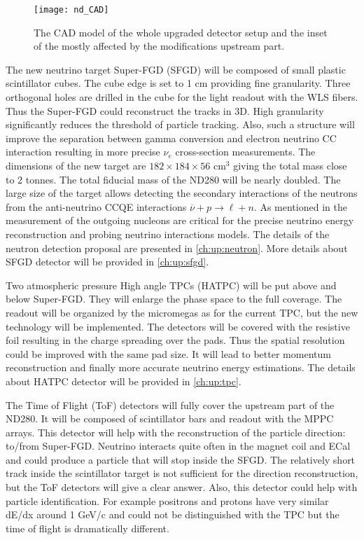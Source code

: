 \documentclass[../main.tex]{subfiles}
\begin{document}
\begin{figure}[!ht]
  \centering
  \texttt{[image: nd\_CAD]}
  \caption{The CAD model of the whole upgraded detector setup and the inset of the mostly affected by the modifications upstream part.}
  \label{fig:up:nd_cad}
\end{figure}

The new neutrino target Super-FGD (SFGD) will be composed of small plastic scintillator cubes. The cube edge is set to 1 cm providing fine granularity. Three orthogonal holes are drilled in the cube for the light readout with the WLS fibers. Thus the Super-FGD could reconstruct the tracks in 3D. High granularity significantly reduces the threshold of particle tracking. Also, such a structure will improve the separation between gamma conversion and electron neutrino CC interaction resulting in more precise $\nu_e$ cross-section measurements. The dimensions of the new target are $182\times184\times56 \text{ cm}^3$ giving the total mass close to 2 tonnes. The total fiducial mass of the ND280 will be nearly doubled. The large size of the target allows detecting the secondary interactions of the neutrons from the anti-neutrino CCQE interactions $\overline{\nu}+p\to\ell+n$. As mentioned in the  measurement of the outgoing nucleons are critical for the precise neutrino energy reconstruction and probing neutrino interactions models. The details of the neutron detection proposal are presented in \autoref{ch:up:neutron}. More details about SFGD detector will be provided in \autoref{ch:up:sfgd}.

Two atmospheric pressure High angle TPCs (HATPC) will be put above and below Super-FGD. They will enlarge the phase space to the full coverage. The readout will be organized by the micromegas as for the current TPC, but the new technology will be implemented. The detectors will be covered with the resistive foil resulting in the charge spreading over the pads. Thus the spatial resolution could be improved with the same pad size. It will lead to better momentum reconstruction and finally more accurate neutrino energy estimations. The details about HATPC detector will be provided in \autoref{ch:up:tpc}.

The Time of Flight (ToF) detectors will fully cover the upstream part of the ND280. It will be composed of scintillator bars and readout with the MPPC arrays. This detector will help with the reconstruction of the particle direction: to/from Super-FGD. Neutrino interacts quite often in the magnet coil and ECal and could produce a particle that will stop inside the SFGD. The relatively short track inside the scintillator target is not sufficient for the direction reconstruction, but the ToF detectors will give a clear answer. Also, this detector could help with particle identification. For example positrons and protons have very similar dE/dx around 1 GeV/c and could not be distinguished with the TPC but the time of flight is dramatically different.
\end{document}
